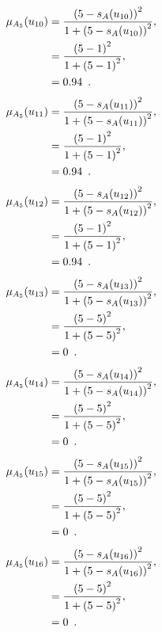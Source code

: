 \documentclass[a4paper,openany]{book}
\begin{document}
				\begin{align}
					\mu_{A_5}(u_{10}) &= \frac{\left(5-s_A(u_{10})\right)^2}{1 + \left(5-s_A(u_{10})\right)^2} ,\\
					&= \frac{\left(5-1\right)^2}{1 + \left(5-1\right)^2} \notag ,\\
					&= 0.94 \enspace. \notag
				\end{align}
				\begin{align}
					\mu_{A_5}(u_{11}) &= \frac{\left(5-s_A(u_{11})\right)^2}{1 + \left(5-s_A(u_{11})\right)^2} ,\\
					&= \frac{\left(5-1\right)^2}{1 + \left(5-1\right)^2} \notag ,\\
					&= 0.94 \enspace. \notag
				\end{align}
				\begin{align}
					\mu_{A_5}(u_{12}) &= \frac{\left(5-s_A(u_{12})\right)^2}{1 + \left(5-s_A(u_{12})\right)^2} ,\\
					&= \frac{\left(5-1\right)^2}{1 + \left(5-1\right)^2} \notag ,\\
					&= 0.94 \enspace. \notag
				\end{align}
				\begin{align}
					\mu_{A_5}(u_{13}) &= \frac{\left(5-s_A(u_{13})\right)^2}{1 + \left(5-s_A(u_{13})\right)^2} ,\\
					&= \frac{\left(5-5\right)^2}{1 + \left(5-5\right)^2} \notag ,\\
					&= 0 \enspace. \notag
				\end{align}
				\begin{align}
					\mu_{A_5}(u_{14}) &= \frac{\left(5-s_A(u_{14})\right)^2}{1 + \left(5-s_A(u_{14})\right)^2} ,\\
					&= \frac{\left(5-5\right)^2}{1 + \left(5-5\right)^2} \notag ,\\
					&= 0 \enspace. \notag
				\end{align}
				\begin{align}
					\mu_{A_5}(u_{15}) &= \frac{\left(5-s_A(u_{15})\right)^2}{1 + \left(5-s_A(u_{15})\right)^2} ,\\
					&= \frac{\left(5-5\right)^2}{1 + \left(5-5\right)^2} \notag ,\\
					&= 0 \enspace. \notag
				\end{align}
				\begin{align}
					\mu_{A_5}(u_{16}) &= \frac{\left(5-s_A(u_{16})\right)^2}{1 + \left(5-s_A(u_{16})\right)^2} ,\\
					&= \frac{\left(5-5\right)^2}{1 + \left(5-5\right)^2} \notag ,\\
					&= 0 \enspace. \notag
				\end{align}
\end{document}
